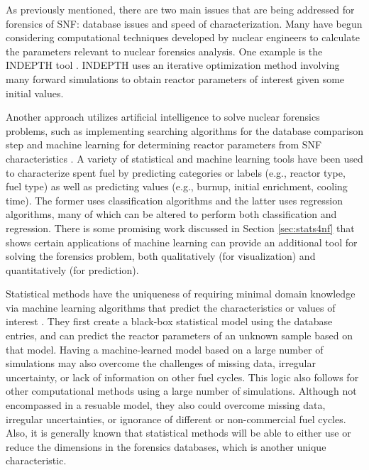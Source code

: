 As previously mentioned, there are two main issues that are being addressed for
forensics of \gls{SNF}: database issues and speed of characterization.  Many
have begun considering computational techniques developed by nuclear engineers
to calculate the parameters relevant to nuclear forensics analysis.  One
example is the \gls{INDEPTH} tool \cite{weber_2006, weber_2010, weber_2011}.
\gls{INDEPTH} uses an iterative optimization method involving many forward
simulations to obtain reactor parameters of interest given some initial values. 

Another approach utilizes artificial intelligence to solve nuclear forensics
problems, such as implementing searching algorithms for the database comparison
step \cite{gey_search} and machine learning for determining reactor parameters
from \gls{SNF} characteristics \cite{dayman_feasibility_2013, nicolaou_2006,
nicolaou_2009, nicolaou_2014, robel_2009, pu_discrimination, jones_viz_2014,
jones_snf_2014}.  A variety of statistical and machine learning tools have been
used to characterize spent fuel by predicting categories or labels (e.g.,
reactor type, fuel type) as well as predicting values (e.g., burnup, initial
enrichment, cooling time). The former uses classification algorithms and the
latter uses regression algorithms, many of which can be altered to perform both
classification and regression.  There is some promising work discussed in
Section \ref{sec:stats4nf} that shows certain applications of machine learning
can provide an additional tool for solving the forensics problem, both
qualitatively (for visualization) and quantitatively (for prediction).

Statistical methods have the uniqueness of requiring minimal domain knowledge
via machine learning algorithms that predict the characteristics or values of
interest \cite{dayman_feasibility_2013, robel_2009, nicolaou_2006,
nicolaou_2009, nicolaou_2014, jones_snf_2014, jones_viz_2014}. They first
create a black-box statistical model using the database entries, and can
predict the reactor parameters of an unknown sample based on that model.
Having a machine-learned model based on a large number of simulations may also
overcome the challenges of missing data, irregular uncertainty, or lack of
information on other fuel cycles.  This logic also follows for other
computational methods using a large number of simulations.  Although not
encompassed in a resuable model, they also could overcome missing data,
irregular uncertainties, or ignorance of different or non-commercial fuel
cycles.  Also, it is generally known that statistical methods will be able to
either use or reduce the dimensions in the forensics databases, which is
another unique characteristic.

